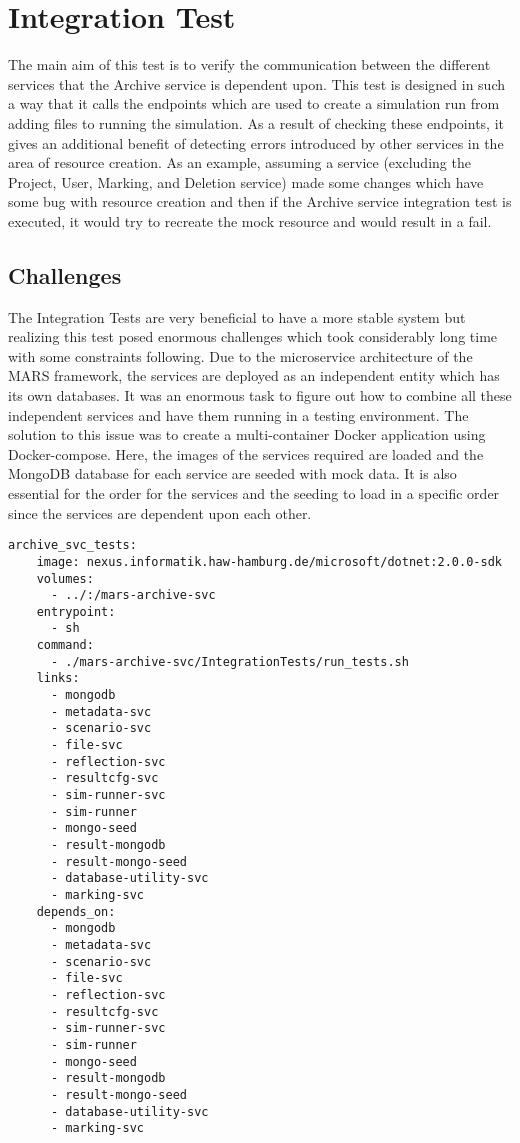 \section{Integration Test}
The main aim of this test is to verify the communication between the different services that the Archive service is dependent upon. This test is designed in 
such a way that it calls the endpoints which are used to create a simulation run from adding files to running the simulation. As a result of checking
these endpoints, it gives an additional benefit of detecting errors introduced by other services in the area of resource creation. As an example, assuming a service
(excluding the Project, User, Marking, and Deletion service)
made some changes which have some bug with resource creation and then if the Archive service integration test is executed, it would try to recreate the mock resource
and would result in a fail.

\subsection{Challenges}
The Integration Tests are very beneficial to have a more stable system but realizing this test posed enormous challenges which took considerably long time 
with some constraints following. Due to the microservice architecture of the MARS framework, the services are deployed as an independent entity which has its own databases.
It was an enormous task to figure out how to combine all these independent services and have them running in a testing environment. The solution to this issue
was to create a multi-container Docker application using Docker-compose. Here, the images of the services required are loaded and the MongoDB database for each
service are seeded with mock data. It is also essential for the order for the services and the seeding to load in a specific order since the services are dependent upon
each other.  

\begin{lstlisting}[language=docker-compose,caption={Docker compose configuration snippet for Archive service Integration Test}, captionpos=b, breaklines=true,label={code:integCompose}]
archive_svc_tests:
    image: nexus.informatik.haw-hamburg.de/microsoft/dotnet:2.0.0-sdk
    volumes:
      - ../:/mars-archive-svc
    entrypoint:
      - sh
    command:
      - ./mars-archive-svc/IntegrationTests/run_tests.sh
    links:
      - mongodb
      - metadata-svc
      - scenario-svc
      - file-svc
      - reflection-svc
      - resultcfg-svc
      - sim-runner-svc
      - sim-runner
      - mongo-seed
      - result-mongodb
      - result-mongo-seed
      - database-utility-svc
      - marking-svc
    depends_on:
      - mongodb
      - metadata-svc
      - scenario-svc
      - file-svc
      - reflection-svc
      - resultcfg-svc
      - sim-runner-svc
      - sim-runner
      - mongo-seed
      - result-mongodb
      - result-mongo-seed
      - database-utility-svc
      - marking-svc
\end{lstlisting}      

